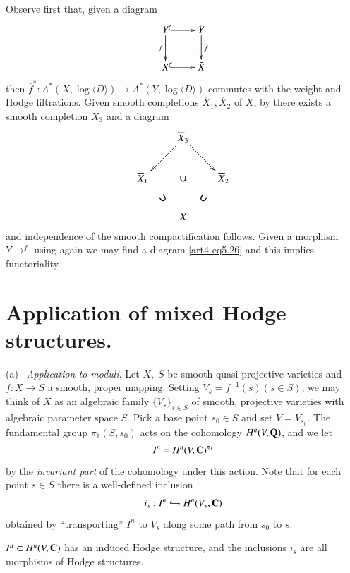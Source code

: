 \begin{enumerate}
Observe first that, given a diagram
\begin{equation}
\vcenter{
\xymatrix{
Y \ar@{^{(}->}[r] \ar[d]_-f & \bar{Y} \ar[d]^-{\overline{f}}\\
X \ar@{^{(}->}[r] & \bar{X}}}\label{art4-eq5.26}
\end{equation}
then $\overline{f}^\ast : A^\ast (X, \log \langle D \rangle) \to A^{\ast} (Y, \log \langle D \rangle)$ commutes with the weight and Hodge filtrations. Given smooth completions $\overline{X}_1, \overline{X}_2$ of $X$, by \cite{art4-key29} there exists a smooth completion $\overline{X}_3$ and a diagram
$$
\xymatrix{
& \overline{X}_3 \ar[dl] \ar[dr]&\\
\overline{X}_1 & \text{\boldmath$\cup$}  & \overline{X}_2 \\
& X \ar@{}[ul]|{\displaystyle{\rotatebox{35}{\boldmath$\cup$}}} \ar@{}[ur]|{\displaystyle{\rotatebox{-35}{\boldmath$\cup$}}} & 
}
$$
and independence of the smooth compactification follows. Given a morphism $ Y {\displaystyle{\mathop{\longrightarrow}^f}}$ using \cite{art4-key29} again we may find a diagram \eqref{art4-eq5.26} and this implies functoriality. 
\end{enumerate}

\section{Application of mixed Hodge structures.}\label{art4-sec6}
(a)~ \textit{Application to moduli}. Let $X, \; S$ be smooth quasi-projective varieties and $f: X \to S$ a smooth, proper mapping. Setting $V_s = f^{-1} (s) (s \in S)$, we may think of $X$ as an algebraic family $\{V_s\}_{s \in S}$ of smooth, projective varieties with algebraic parameter space $S$. Pick a base point $s_0 \in S$ and set $V = V_{s_0}$. The fundamental group $\pi_1 (S, s_0)$ acts on the cohomology $H^n (V, \mathbf{Q})$, and we let
$$
I^n  = H^n (V, \mathbf{C})^{\pi_1}
$$
by the \textit{invariant part} of the cohomology under this action. Note that for each point $s \in S$ there is a well-defined inclusion
$$
i_s : I^n \hookrightarrow H^n (V_s, \mathbf{C})
$$\pageoriginale
obtained by ``transporting'' $I^n$ to $V_s$ along some path from $s_0$ to $s$.

\setcounter{proposition}{0}
\begin{proposition}\label{art4-prop6.1}
$I^n \subset H^n (V, \mathbf{C})$ has an induced Hodge structure, and the inclusions $i_s$ are all morphisms of Hodge structures. 
\end{proposition}

